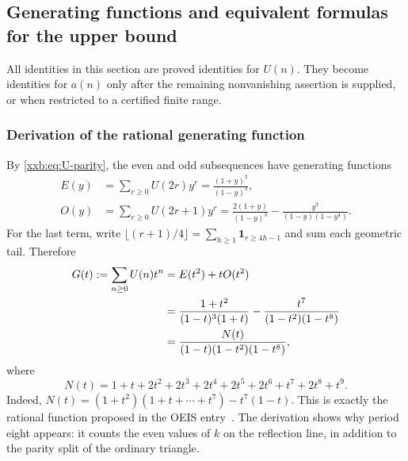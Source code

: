 \documentclass[11pt,a4paper]{article}
\numberwithin{equation}{section}
\theoremstyle{definition}
\theoremstyle{remark}
\theoremstyle{plain}
\newcommand{\U}{U}
\begin{document}
\subsection{Generating functions and equivalent formulas for the upper bound}
\label{xxb:sec:gf}
All identities in this section are proved identities for $\U(n)$.
They become identities for $a(n)$ only after the remaining nonvanishing
assertion is supplied, or when restricted to a certified finite range.

\subsubsection{Derivation of the rational generating function}
By \eqref{xxb:eq:U-parity}, the even and odd subsequences have generating
functions
\begin{align}
 E(y)&=\sum_{r\ge0}\U(2r)y^r
       =\frac{(1+y)^2}{(1-y)^3},\label{xxb:eq:E}\\
 O(y)&=\sum_{r\ge0}\U(2r+1)y^r
       =\frac{2(1+y)}{(1-y)^3}
          -\frac{y^3}{(1-y)(1-y^4)}.\label{xxb:eq:O}
\end{align}
For the last term, write
$\lfloor(r+1)/4\rfloor=\sum_{h\ge1}\mathbf1_{r\ge4h-1}$ and sum each
geometric tail. Therefore
\begin{align}
 G(t):=\sum_{n\ge0}\U(n)t^n
 &=E(t^2)+tO(t^2)\notag\\
 &=\frac{1+t^2}{(1-t)^3(1+t)}
       -\frac{t^7}{(1-t^2)(1-t^8)}\notag\\
 &=\frac{N(t)}{(1-t)(1-t^2)(1-t^8)},\label{xxb:eq:GF}
\end{align}
where
\begin{equation}\label{xxb:eq:N}
 N(t)=1+t+2t^2+2t^3+2t^4+2t^5+2t^6+t^7+2t^8+t^9.
\end{equation}
Indeed,
$N(t)=(1+t^2)(1+t+\cdots+t^7)-t^7(1-t)$.
This is exactly the rational function proposed in the OEIS entry~\cite{oeis290268}.
The derivation shows why period eight appears: it counts the even values
of $k$ on the reflection line, in addition to the parity split of the
ordinary triangle.
\end{document}
